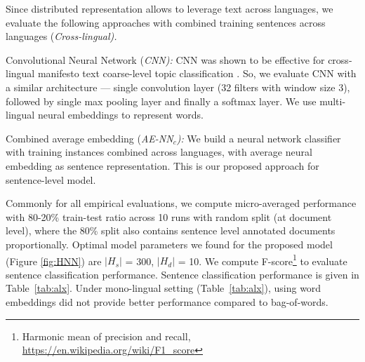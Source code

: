 \documentclass[11pt,a4paper]{article}
\newcommand{\tabref}[2][]{Table#1~\ref{#2}\xspace}
\newcommand{\norm}[1]{\vert #1 \vert}
\begin{document}

Since distributed representation allows to leverage text across languages, we evaluate the following approaches with combined training sentences across languages (\em{Cross-lingual}). \rm
\begin{description}
\item{Convolutional Neural Network (\em{CNN}):} CNN was shown to be effective for cross-lingual manifesto text coarse-level  topic classification \cite{W17-2906}. So, we evaluate CNN with a similar architecture --- single convolution layer (32 filters with window size 3), followed by single max pooling layer and finally a softmax layer. We use multi-lingual neural embeddings to represent words.
\item{Combined average embedding (\em{AE-NN$_{c}$}):} We build a neural network classifier with training instances combined across languages, with average neural embedding as sentence representation. This is our proposed approach for sentence-level model.
\end{description}

Commonly for all empirical evaluations, we compute micro-averaged performance with 80-20\% train-test ratio across 10 runs with random split (at document level), where the 80\% split also contains sentence level annotated documents proportionally. Optimal model parameters we found for the proposed model (Figure \ref{fig:HNN}) are $\norm{H_{s}}$ = 300, $\norm{H_{d}}$ = 10. We compute F-score\footnote{Harmonic mean of precision and recall, \url{https://en.wikipedia.org/wiki/F1_score}} to evaluate sentence classification performance. Sentence classification performance is given in \tabref{tab:alx}. Under mono-lingual setting (\tabref{tab:alx}), using word embeddings did not provide better performance compared to bag-of-words. 
\end{document}

